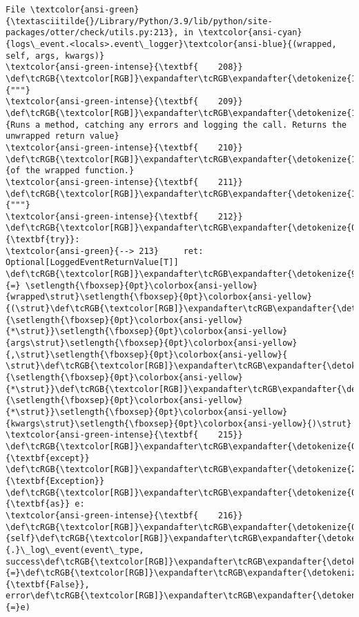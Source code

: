 \documentclass[11pt]{article}
\begin{document}
\begin{Verbatim}[commandchars=\\\{\}, frame=single, framerule=2mm, rulecolor=\color{outerrorbackground}]
File \textcolor{ansi-green}{\textasciitilde{}/Library/Python/3.9/lib/python/site-packages/otter/check/utils.py:213}, in \textcolor{ansi-cyan}{logs\_event.<locals>.event\_logger}\textcolor{ansi-blue}{(wrapped, self, args, kwargs)}
\textcolor{ansi-green-intense}{\textbf{    208}} \def\tcRGB{\textcolor[RGB]}\expandafter\tcRGB\expandafter{\detokenize{175,0,0}}{"""}
\textcolor{ansi-green-intense}{\textbf{    209}} \def\tcRGB{\textcolor[RGB]}\expandafter\tcRGB\expandafter{\detokenize{175,0,0}}{Runs a method, catching any errors and logging the call. Returns the unwrapped return value}
\textcolor{ansi-green-intense}{\textbf{    210}} \def\tcRGB{\textcolor[RGB]}\expandafter\tcRGB\expandafter{\detokenize{175,0,0}}{of the wrapped function.}
\textcolor{ansi-green-intense}{\textbf{    211}} \def\tcRGB{\textcolor[RGB]}\expandafter\tcRGB\expandafter{\detokenize{175,0,0}}{"""}
\textcolor{ansi-green-intense}{\textbf{    212}} \def\tcRGB{\textcolor[RGB]}\expandafter\tcRGB\expandafter{\detokenize{0,135,0}}{\textbf{try}}:
\textcolor{ansi-green}{--> 213}     ret: Optional[LoggedEventReturnValue[T]] \def\tcRGB{\textcolor[RGB]}\expandafter\tcRGB\expandafter{\detokenize{98,98,98}}{=} \setlength{\fboxsep}{0pt}\colorbox{ansi-yellow}{wrapped\strut}\setlength{\fboxsep}{0pt}\colorbox{ansi-yellow}{(\strut}\def\tcRGB{\textcolor[RGB]}\expandafter\tcRGB\expandafter{\detokenize{98,98,98}}{\setlength{\fboxsep}{0pt}\colorbox{ansi-yellow}{*\strut}}\setlength{\fboxsep}{0pt}\colorbox{ansi-yellow}{args\strut}\setlength{\fboxsep}{0pt}\colorbox{ansi-yellow}{,\strut}\setlength{\fboxsep}{0pt}\colorbox{ansi-yellow}{ \strut}\def\tcRGB{\textcolor[RGB]}\expandafter\tcRGB\expandafter{\detokenize{98,98,98}}{\setlength{\fboxsep}{0pt}\colorbox{ansi-yellow}{*\strut}}\def\tcRGB{\textcolor[RGB]}\expandafter\tcRGB\expandafter{\detokenize{98,98,98}}{\setlength{\fboxsep}{0pt}\colorbox{ansi-yellow}{*\strut}}\setlength{\fboxsep}{0pt}\colorbox{ansi-yellow}{kwargs\strut}\setlength{\fboxsep}{0pt}\colorbox{ansi-yellow}{)\strut}
\textcolor{ansi-green-intense}{\textbf{    215}} \def\tcRGB{\textcolor[RGB]}\expandafter\tcRGB\expandafter{\detokenize{0,135,0}}{\textbf{except}} \def\tcRGB{\textcolor[RGB]}\expandafter\tcRGB\expandafter{\detokenize{215,95,95}}{\textbf{Exception}} \def\tcRGB{\textcolor[RGB]}\expandafter\tcRGB\expandafter{\detokenize{0,135,0}}{\textbf{as}} e:
\textcolor{ansi-green-intense}{\textbf{    216}}     \def\tcRGB{\textcolor[RGB]}\expandafter\tcRGB\expandafter{\detokenize{0,135,0}}{self}\def\tcRGB{\textcolor[RGB]}\expandafter\tcRGB\expandafter{\detokenize{98,98,98}}{.}\_log\_event(event\_type, success\def\tcRGB{\textcolor[RGB]}\expandafter\tcRGB\expandafter{\detokenize{98,98,98}}{=}\def\tcRGB{\textcolor[RGB]}\expandafter\tcRGB\expandafter{\detokenize{0,135,0}}{\textbf{False}}, error\def\tcRGB{\textcolor[RGB]}\expandafter\tcRGB\expandafter{\detokenize{98,98,98}}{=}e)


\end{Verbatim}
\end{document}
